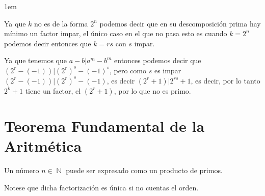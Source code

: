 \documentclass[12pt, fleqn]{report}                             %
\newenvironment{SmallIndentation}[1][0.75em]                    %
    {\begin{adjustwidth}{#1}{}\begin{footnotesize}}                 %
    {\end{footnotesize}\end{adjustwidth}}                           %
\DeclareMathOperator \Naturals  {\mathbb{N}}                     %
\begin{document}
\begin{itemize}
\begin{SmallIndentation}[1em]
                        Ya que $k$ no es de la forma $2^n$ podemos
                        decir que en su descomposición prima hay mínimo un factor
                        impar, el único caso en el que no pasa esto es cuando $k=2^n$
                        podemos decir entonces que $k=rs$ con $s$ impar.

                        Ya que tenemos que $a-b|a^m -b^m$ entonces podemos decir que
                        $(2^r - (-1))|(2^r)^s - (-1)^s$, pero como $s$ es impar
                        $(2^r - (-1))|(2^r)^s - (-1)$, es decir
                        $(2^r + 1)|2^{rs} + 1$, es decir, por lo tanto $2^k +1$ tiene un 
                        factor, el $(2^r + 1)$, por lo que no es primo.

                    \end{SmallIndentation}


        \end{itemize}





    \clearpage
    \section{Teorema Fundamental de la Aritmética}

        Un número $n \in \Naturals$ puede ser expresado como
        un producto de primos.

        Notese que dicha factorización es única si no cuentas el 
        orden.
\end{document}
